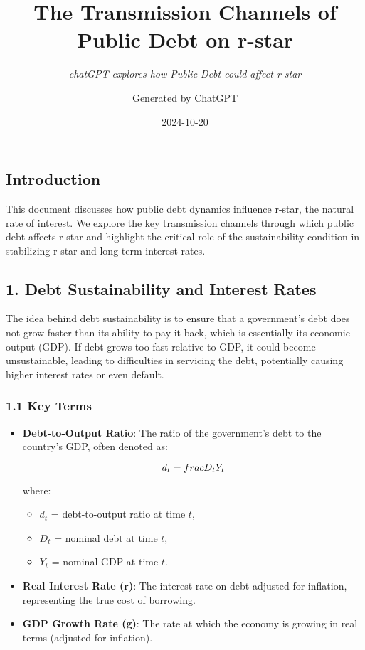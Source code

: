 \documentclass[
  letterpaper,
  DIV=11,
  numbers=noendperiod]{scrartcl}
\title{The Transmission Channels of Public Debt on r-star}
\subtitle{\emph{chatGPT explores how Public Debt could affect r-star}}
\author{Generated by ChatGPT}
\date{2024-10-20}
\providecommand{\tightlist}{%
  \setlength{\itemsep}{0pt}\setlength{\parskip}{0pt}}\usepackage{longtable,booktabs,array}
\begin{document}
\maketitle

\subsection{Introduction}\label{introduction}

This document discusses how public debt dynamics influence r-star, the
natural rate of interest. We explore the key transmission channels
through which public debt affects r-star and highlight the critical role
of the sustainability condition in stabilizing r-star and long-term
interest rates.

\subsection{1. Debt Sustainability and Interest
Rates}\label{debt-sustainability-and-interest-rates}

The idea behind debt sustainability is to ensure that a government's
debt does not grow faster than its ability to pay it back, which is
essentially its economic output (GDP). If debt grows too fast relative
to GDP, it could become unsustainable, leading to difficulties in
servicing the debt, potentially causing higher interest rates or even
default.

\subsubsection{1.1 Key Terms}\label{key-terms}

\begin{itemize}
\item
  \textbf{Debt-to-Output Ratio}: The ratio of the government's debt to
  the country's GDP, often denoted as:

  \[d_t = \\frac{D_t}{Y_t}\]

  where:

  \begin{itemize}
  \tightlist
  \item
    \(d_t\) = debt-to-output ratio at time \(t\),
  \item
    \(D_t\) = nominal debt at time \(t\),
  \item
    \(Y_t\) = nominal GDP at time \(t\).
  \end{itemize}
\item
  \textbf{Real Interest Rate (r)}: The interest rate on debt adjusted
  for inflation, representing the true cost of borrowing.
\item
  \textbf{GDP Growth Rate (g)}: The rate at which the economy is growing
  in real terms (adjusted for inflation).
\end{itemize}
\end{document}
